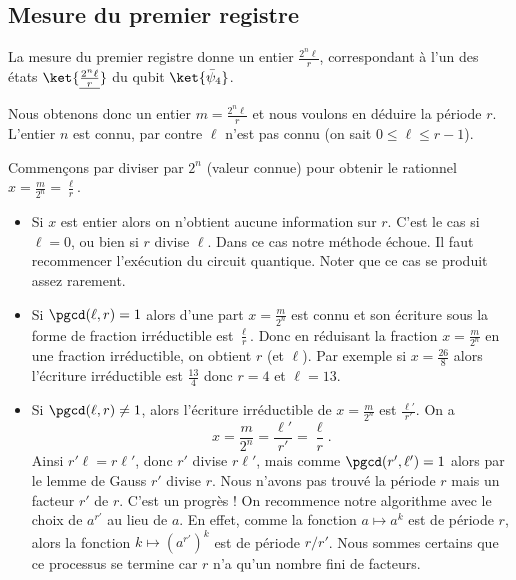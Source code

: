 \documentclass[11pt,class=report,crop=false]{standalone}
\begin{document}
\subsection{Mesure du premier registre}

La mesure du premier registre donne un entier $\frac{2^n \ell}{r}$, correspondant à l'un des états
$\ket{\underline{\frac{2^n \ell}{r}}}$ du qubit $\ket{\bar \psi_4}$.

Nous obtenons donc un entier $m=\frac{2^n \ell}{r}$ et nous voulons en déduire la période $r$.
L'entier $n$ est connu, par contre $\ell$ n'est pas connu (on sait $0 \le \ell \le r-1$).

Commençons par diviser par $2^n$ (valeur connue) pour obtenir le rationnel $x = \frac{m}{2^n} = \frac{\ell}{r}$.
\begin{itemize}
  \item Si $x$ est entier alors on n'obtient aucune information sur $r$. C'est le cas si $\ell=0$, ou bien si $r$ divise $\ell$. Dans ce cas notre méthode échoue. Il faut recommencer l'exécution du circuit quantique. Noter que ce cas se produit assez rarement.

  \item Si $\pgcd(\ell,r) = 1$ alors d'une part $x = \frac{m}{2^n}$ est connu et son écriture sous la forme de fraction irréductible est $\frac{\ell}{r}$. Donc en réduisant la fraction $x = \frac{m}{2^n}$ en une fraction irréductible, on obtient $r$ (et $\ell$). Par exemple si $x=\frac{26}{8}$ alors l'écriture irréductible est $\frac{13}{4}$ donc $r=4$ et $\ell=13$.

  \item Si $\pgcd(\ell,r) \neq 1$, alors l'écriture irréductible de $x=\frac{m}{2^n}$ est $\frac{\ell'}{r'}$.
On a $$x=\frac{m}{2^n} = \frac{\ell'}{r'} = \frac{\ell}{r}.$$
Ainsi $r'\ell=r\ell'$, donc $r'$ divise $r\ell'$, mais comme $\pgcd(r',\ell')=1$ alors par le lemme de Gauss $r'$ divise $r$. Nous n'avons pas trouvé la période $r$ mais un facteur $r'$ de $r$. C'est un progrès ! On recommence notre algorithme avec le choix de $a^{r'}$ au lieu de $a$. En effet, comme la fonction $a \mapsto a^k$ est de période $r$, alors la fonction $k \mapsto (a^{r'})^k$ est de période $r/r'$. Nous sommes certains que ce processus se termine car $r$ n'a qu'un nombre fini de facteurs.
\end{itemize}



\end{document}
